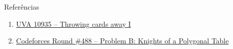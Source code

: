 \begin{frame}[fragile]{Referências}

    \begin{enumerate}
        \item \href{https://uva.onlinejudge.org/index.php?option=com_onlinejudge&Itemid=8&category=24&page=show_problem&problem=1876}{UVA 10935 -- Throwing cards away I}

        \item \href{https://codeforces.com/problemset/problem/994/B}{Codeforces Round \#488 -- Problem B: Knights of a Polygonal Table}

    \end{enumerate}

\end{frame}
